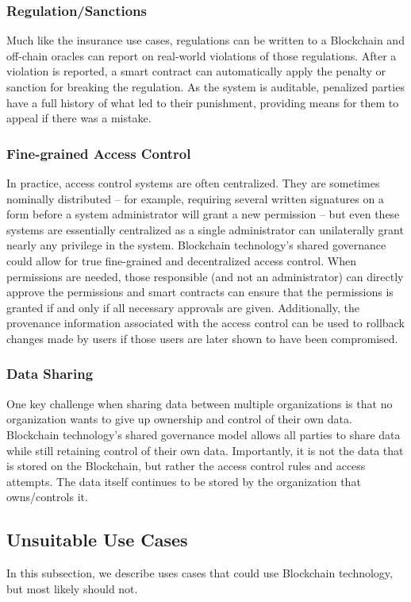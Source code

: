 \subsubsection{Regulation/Sanctions}
Much like the insurance use cases, regulations can be written to a Blockchain and off-chain oracles can report on real-world violations of those regulations.
After a violation is reported, a smart contract can automatically apply the penalty or sanction for breaking the regulation.
As the system is auditable, penalized parties have a full history of what led to their punishment, providing means for them to appeal if there was a mistake.

\subsubsection{Fine-grained Access Control}
In practice, access control systems are often centralized. They are sometimes nominally distributed -- for example, requiring several written signatures on a form before a system administrator will grant a new permission -- but even these systems are essentially centralized as a single administrator can unilaterally grant nearly any privilege in the system.
Blockchain technology's shared governance could allow for true fine-grained and decentralized access control.
When permissions are needed, those responsible (and not an administrator) can directly approve the permissions and smart contracts can ensure that the permissions is granted if and only if all necessary approvals are given.
Additionally, the provenance information associated with the access control can be used to rollback changes made by users if those users are later shown to have been compromised.

\subsubsection{Data Sharing}
One key challenge when sharing data between multiple organizations is that no organization wants to give up ownership and control of their own data.
Blockchain technology's shared governance model allows all parties to share data while still retaining control of their own data.
Importantly, it is not the data that is stored on the Blockchain, but rather the access control rules and access attempts.
The data itself continues to be stored by the organization that owns/controls it.

\subsection{Unsuitable Use Cases}
In this subsection, we describe uses cases that could use Blockchain technology, but most likely should not.

